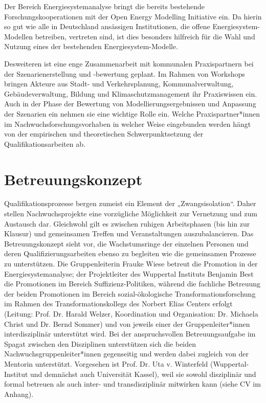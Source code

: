 \documentclass[a4paper,11pt,twoside]{scrartcl}
\begin{document}
Der Bereich Energiesystemanalyse bringt die bereits bestehende Forschungskooperationen mit der Open Energy Modelling Initiative \cite{openmod} ein. Da hierin so gut wie alle in Deutschland ansässigen Institutionen, die offene Energiesystem-Modellen betreiben, vertreten sind, ist dies besonders hilfreich für die Wahl und Nutzung eines der bestehenden Energiesystem-Modelle. 

Desweiteren ist eine enge Zusammenarbeit mit kommunalen Praxispartnern bei der Szenarienerstellung und -bewertung geplant. Im Rahmen von Workshops bringen Akteure aus Stadt- und Verkehrsplanung, Kommunalverwaltung, Gebäudeverwaltung, Bildung und Klimaschutzmanagement ihr Praxiswissen ein. Auch in der Phase der Bewertung von Modellierungsergebnissen und Anpassung der Szenarien ein nehmen sie eine wichtige Rolle ein. Welche Praxispartner*innen im Nachwuchsforschungsvorhaben in welcher Weise eingebunden werden hängt von der empirischen und theoretischen Schwerpunktsetzung der Qualifikationsarbeiten ab.


\section{Betreuungskonzept}

Qualifikationsprozesse bergen zumeist ein Element der „Zwangsisolation“. Daher stellen Nachwuchsprojekte eine vorzügliche Möglichkeit zur Vernetzung und zum Austausch dar. Gleichwohl gilt es zwischen ruhigen Arbeitsphasen (bis hin zur Klausur) und gemeinsamen Treffen und Veranstaltungen auszubalancieren. Das Betreuungskonzept sieht vor, die Wachstumsringe der einzelnen Personen und deren Qualifizierungsarbeiten ebenso zu begleiten wie die gemeinsamen Prozesse zu unterstützen.
Die Gruppenleiterin Frauke Wiese betreut die Promotion in der Energiesystemanalyse; der Projektleiter des Wuppertal Instituts Benjamin Best die Promotionen im Bereich Suffizienz-Politiken, während die fachliche Betreuung der beiden Promotionen im Bereich sozial-ökologische Transformationsforschung im Rahmen des Transformationskollegs des Norbert Elias Centers erfolgt (Leitung: Prof. Dr. Harald Welzer, Koordination und Organisation: Dr. Michaela Christ und Dr. Bernd Sommer) und von jeweils einer der Gruppenleiter*innen interdisziplinär unterstützt wird. Bei der anspruchsvollen Betreuungsaufgabe im Spagat zwischen den Disziplinen unterstützen sich die beiden Nachwuchsgruppenleiter*innen gegenseitig und werden dabei zugleich von der Mentorin unterstützt. Vorgesehen ist Prof. Dr. Uta v. Winterfeld (Wuppertal-Institut und demnächst auch Universität Kassel), weil sie sowohl disziplinär und formal betreuen als auch inter- und transdisziplinär mitwirken kann (siehe CV im Anhang).
\end{document}

